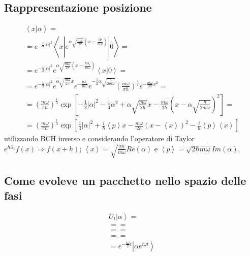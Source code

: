 \subsection{Rappresentazione posizione} %
\begin{equation}\begin{split}
\left\langle x|\alpha \right\rangle=\\
=e^{-\frac{1}{2}|\alpha|^2}\left\langle x|e^{\alpha\sqrt{\frac{m\omega }{2\pi}}\left(x-\frac{ip}{m\omega }\right)}|0 \right\rangle=\\
=e^{-\frac{1}{2}|\alpha|^2}e^{\alpha\sqrt{\frac{m\omega }{2\pi}}\left(x-\frac{\hbar \partial _x}{m\omega }\right)}\left\langle x|0 \right\rangle=\\
=e^{-\frac{1}{2}|\alpha|^2}e^{\alpha\sqrt{\frac{m\omega }{2\pi}}x}e^{-\frac{\hbar \partial _x}{m\omega }}e^{-\frac{1}{2}\alpha\sqrt{\frac{\hbar }{2m\omega }}}\left(\frac{m\omega }{\pi \hbar }\right)^{\frac{1}{4}}e^{-\frac{m\omega }{2\hbar }x^2}=\\
=\left(\frac{m\omega }{\pi \hbar }\right)^{\frac{1}{4}}\exp{\left[-\frac{1}{2}|\alpha|^2-\frac{1}{4}\alpha^2+\alpha\sqrt{\frac{m\omega }{2\hbar }}x-\frac{m\omega }{2\hbar }\left(x-\alpha\sqrt{\frac{\hbar }{2m\omega }}\right)^2\right]}=\\
=\left(\frac{m\omega }{\pi \hbar }\right)^{\frac{1}{4}}\exp{\left[\frac{1}{4}|\alpha|^2+\frac{i}{\hbar }\left\langle p \right\rangle x-\frac{m\omega }{2\hbar }\left(x-\left\langle x \right\rangle\right)^2-\frac{i}{\hbar }\left\langle p \right\rangle\left\langle x \right\rangle\right]}
\end{split}\end{equation}
utilizzando BCH inverso e considerando l'operatore di Taylor $e^{h\partial _x}f\left(x\right)\Longrightarrow f\left(x+h\right)$; $\left\langle x \right\rangle=\sqrt{\frac{2\hbar }{m\omega }}Re(\alpha)$ e $\left\langle p \right\rangle=\sqrt{2\hbar m\omega }Im(\alpha)$.

\subsection{Come evoleve un pacchetto nello spazio delle fasi} %


\begin{equation}\begin{split}
U_t\left |\alpha \right\rangle=\\
= =\\
= =\\
= =\\
=e^{-\frac{i\omega }{2}t}\left |\alpha e^{i\omega t} \right\rangle
\end{split}\end{equation}

